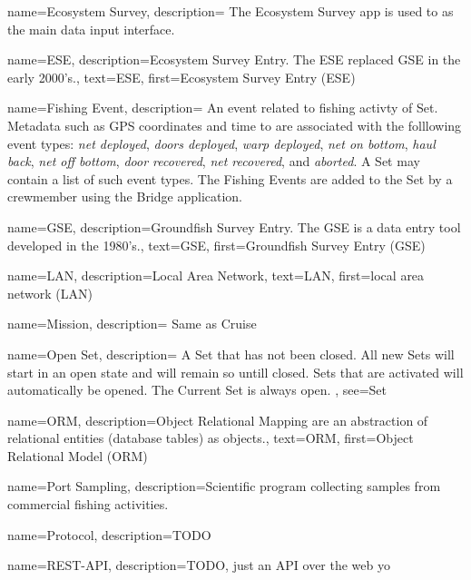  {
  name=Ecosystem Survey,
  description={
    The Ecosystem Survey app is used to as the main data input interface.
    }
}

 {
  name=ESE,
  description={Ecosystem Survey Entry. The ESE replaced \gls{GSE} in the early 2000's.},
  text={ESE},
  first={Ecosystem Survey Entry (ESE)}
}

 {
  name=Fishing Event,
  description={
    An event related to fishing activty of \gls{Set}.
    Metadata such as GPS coordinates and time to are associated with the folllowing event types:
    \emph{net deployed},
    \emph{doors deployed},
    \emph{warp deployed},
    \emph{net on bottom},
    \emph{haul back},
    \emph{net off bottom},
    \emph{door recovered},
    \emph{net recovered},
    and \emph{aborted}.
    A \gls{Set} may contain a list of such event types.
    The Fishing Events are added to the \gls{Set} by a crewmember using the \gls{Bridge} application.
  }
}

 {
  name=GSE,
  description={Groundfish Survey Entry. The GSE is a data entry tool developed in the 1980's.},
  text={GSE},
  first={Groundfish Survey Entry (GSE)}
}

 {
  name=LAN,
  description={Local Area Network},
  text={LAN},
  first={local area network (LAN)}
}

 {
  name=Mission,
  description={
    Same as \gls{Cruise}
  }
}

 {
  name=Open Set,
  description={
    A \gls{Set} that has not been closed. All new Sets will start in an open state and will remain so untill closed.
    Sets that are activated will automatically be opened.
    The \gls{Current Set} is always open.
  },
  see={Set}
}

 {
  name=ORM,
  description={Object Relational Mapping are an abstraction of relational entities (database tables) as objects.},
  text={ORM},
  first={Object Relational Model (ORM)}
}

 {
  name=Port Sampling,
  description={Scientific program collecting samples from commercial fishing activities.}
}

 {
  name=Protocol,
  description={TODO}
}

 {
  name=REST-API,
  description={TODO, just an API over the web yo}
}

